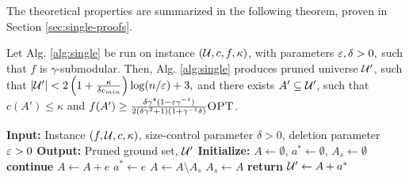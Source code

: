 The theoretical properties are summarized in the following theorem, proven in Section \ref{sec:single-proofs}.
\begin{theorem} \label{thm:single}
  Let Alg. \ref{alg:single} be run on instance $(\mathcal{U}, c, f, \kappa)$, with parameters $\varepsilon, \delta > 0,$
  such that $f$ is $\gamma$-submodular. 
  Then, Alg. \ref{alg:single} produces pruned universe $\mathcal{U}'$, such that
  $| \mathcal{U} ' | < 2 \left( 1 + \frac{\kappa }{\delta c_{min} } \right) \log ( n / \varepsilon ) + 3,$
  and there exists $A' \subseteq \mathcal{U}'$, such that $c(A') \le \kappa$ and
  $f(A') \ge \frac{\delta \gamma^4(1 - \varepsilon \gamma^{-1})}{2(\delta \gamma^2 + 1)( 1 + \gamma^{-1} \delta ) } \textsc{OPT}$.
\end{theorem}
\begin{algorithm}[t]
	\caption{\qss:  Pruning for a single constraint.}
	\begin{algorithmic}[1] \label{alg:single}
		\STATE \textbf{Input:} Instance $(f, \mathcal{U}, c, \kappa)$, size-control parameter $\delta > 0$, deletion parameter $\varepsilon > 0$
		\STATE \textbf{Output:} Pruned ground set, $\mathcal{U}'$
		\STATE \textbf{Initialize:} $A \gets \emptyset$, $a^* \gets \emptyset$, $A_s \gets \emptyset$
                \STATE \textbf{continue}
                \ENDIF{}
                \STATE $A \gets A + e$
                \ENDIF{}
                \STATE $a^* \gets e$
                \ENDIF
                \STATE $A \gets A \setminus A_s$ \label{line:delete-set}
                \STATE $A_s \gets A$
                \ENDIF
                \ENDFOR
                \STATE \textbf{return} $\mathcal{U}' \gets A + a^*$ 
	\end{algorithmic}
\end{algorithm}
